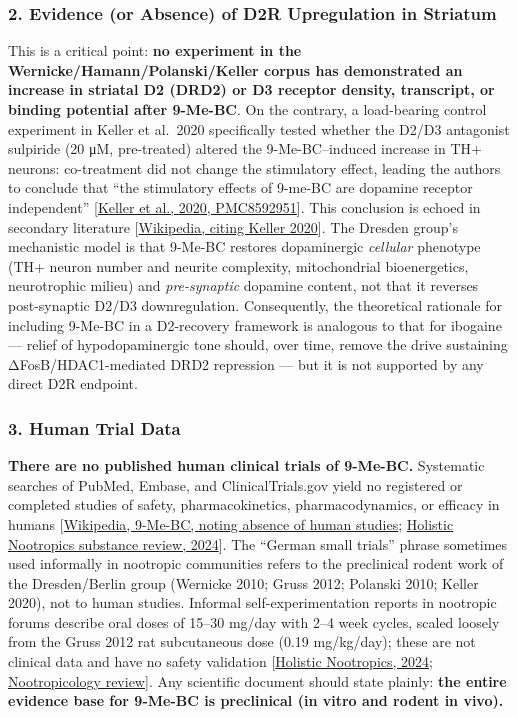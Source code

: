 \subsubsection{2. Evidence (or Absence) of D2R Upregulation in Striatum}\label{20_ibogaine-evidence-or-absence-of-d2r-upregulation-in-striatum}

This is a critical point: \textbf{no experiment in the Wernicke/Hamann/Polanski/Keller corpus has demonstrated an increase in striatal D2 (DRD2) or D3 receptor density, transcript, or binding potential after 9-Me-BC}. On the contrary, a load-bearing control experiment in Keller et al.~2020 specifically tested whether the D2/D3 antagonist sulpiride (20 μM, pre-treated) altered the 9-Me-BC--induced increase in TH+ neurons: co-treatment did not change the stimulatory effect, leading the authors to conclude that ``the stimulatory effects of 9-me-BC are dopamine receptor independent'' {[}\href{https://pmc.ncbi.nlm.nih.gov/articles/PMC8592951/}{Keller et al., 2020, PMC8592951}{]}. This conclusion is echoed in secondary literature {[}\href{https://en.wikipedia.org/wiki/9-Methyl-\%CE\%B2-carboline}{Wikipedia, citing Keller 2020}{]}. The Dresden group's mechanistic model is that 9-Me-BC restores dopaminergic \emph{cellular} phenotype (TH+ neuron number and neurite complexity, mitochondrial bioenergetics, neurotrophic milieu) and \emph{pre-synaptic} dopamine content, not that it reverses post-synaptic D2/D3 downregulation. Consequently, the theoretical rationale for including 9-Me-BC in a D2-recovery framework is analogous to that for ibogaine --- relief of hypodopaminergic tone should, over time, remove the drive sustaining ΔFosB/HDAC1-mediated DRD2 repression --- but it is not supported by any direct D2R endpoint.

\subsubsection{3. Human Trial Data}\label{20_ibogaine-human-trial-data}

\textbf{There are no published human clinical trials of 9-Me-BC.} Systematic searches of PubMed, Embase, and ClinicalTrials.gov yield no registered or completed studies of safety, pharmacokinetics, pharmacodynamics, or efficacy in humans {[}\href{https://en.wikipedia.org/wiki/9-Methyl-\%CE\%B2-carboline}{Wikipedia, 9-Me-BC, noting absence of human studies}; \href{https://holisticnootropics.com/substances/9-methyl-carboline/}{Holistic Nootropics substance review, 2024}{]}. The ``German small trials'' phrase sometimes used informally in nootropic communities refers to the preclinical rodent work of the Dresden/Berlin group (Wernicke 2010; Gruss 2012; Polanski 2010; Keller 2020), not to human studies. Informal self-experimentation reports in nootropic forums describe oral doses of 15--30 mg/day with 2--4 week cycles, scaled loosely from the Gruss 2012 rat subcutaneous dose (0.19 mg/kg/day); these are not clinical data and have no safety validation {[}\href{https://holisticnootropics.com/substances/9-methyl-carboline/}{Holistic Nootropics, 2024}; \href{https://nootropicology.com/9-me-bc/}{Nootropicology review}{]}. Any scientific document should state plainly: \textbf{the entire evidence base for 9-Me-BC is preclinical (in vitro and rodent in vivo).}

